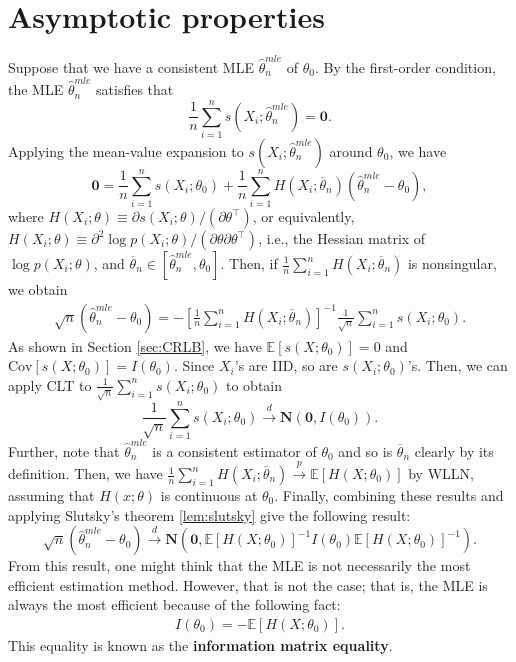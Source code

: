 \documentclass[10.5pt, A4paper, openany, uplatex]{book}
\newcommand{\mbf}{\mathbf}
\newcommand{\E}{\mathbb{E}}
\newcommand{\Cov}{\mathrm{Cov}}
\renewcommand{\hat}{\widehat}
\renewcommand{\bar}{\overline}
\numberwithin{equation}{section}
\begin{document}
\section{Asymptotic properties}
Suppose that we have a consistent MLE $\hat \theta_n^{mle}$ of $\theta_0$.
By the first-order condition, the MLE $\hat \theta_n^{mle}$ satisfies that
\[
	\frac{1}{n}\sum_{i = 1}^n s(X_i; \hat \theta_n^{mle}) = \mbf{0}.
\]
Applying the mean-value expansion to $s(X_i; \hat \theta_n^{mle}) $ around $\theta_0$, we have
\[
	\mbf{0} = \frac{1}{n}\sum_{i = 1}^n s(X_i; \theta_0) + \frac{1}{n}\sum_{i=1}^n H(X_i; \bar \theta_n) (\hat \theta_n^{mle} - \theta_0),
\]
where $H(X_i; \theta) \equiv \partial s(X_i; \theta)/(\partial \theta^\top)$, or equivalently, $H(X_i; \theta) \equiv \partial^2 \log p(X_i; \theta)/(\partial \theta \partial \theta^\top)$, i.e., the Hessian matrix of $\log p(X_i; \theta)$, and $\bar \theta_n \in [\hat \theta_n^{mle}, \theta_0]$.
Then, if $\frac{1}{n}\sum_{i=1}^n H(X_i; \bar \theta_n) $ is nonsingular, we obtain
\begin{align}\label{eq:taylor}
	\sqrt{n}(\hat \theta_n^{mle} - \theta_0) = -\left[\frac{1}{n}\sum_{i=1}^n H(X_i; \bar \theta_n) \right]^{-1}\frac{1}{\sqrt{n}}\sum_{i = 1}^n s(X_i; \theta_0).
\end{align}
As shown in Section \ref{sec:CRLB}, we have $\E[s(X; \theta_0)] = 0$ and $\Cov[s(X; \theta_0)] = I(\theta_0)$.
Since $X_i$'s are IID, so are $s(X_i; \theta_0)$'s.
Then, we can apply CLT to $\frac{1}{\sqrt{n}}\sum_{i = 1}^n s(X_i; \theta_0)$ to obtain
\[
	\frac{1}{\sqrt{n}}\sum_{i = 1}^n s(X_i; \theta_0) \overset{d}{\to} \mbf{N}(\mbf{0},  I(\theta_0)).
\]
Further, note that $\hat \theta_n^{mle}$ is a consistent estimator of $\theta_0$ and so is $\bar{\theta}_n$ clearly by its definition.
Then, we have $\frac{1}{n}\sum_{i=1}^n H(X_i; \bar \theta_n) \overset{p}{\to} \E[H(X; \theta_0)]$ by WLLN, assuming that $H(x; \theta)$ is continuous at $\theta_0$.
Finally, combining these results and applying Slutsky's theorem \ref{lem:slutsky} give the following result:
\[
	\sqrt{n}(\hat \theta_n^{mle} - \theta_0) \overset{d}{\to} \mbf{N}\left( \mbf{0}, \E[H(X; \theta_0)]^{-1} I(\theta_0) \E[H(X; \theta_0)]^{-1} \right).
\]
From this result, one might think that the MLE is not necessarily the most efficient estimation method.
However, that is not the case; that is, the MLE is always the most efficient because of the following fact:
\begin{align}\label{eq:infoeq}
	I(\theta_0) = - \E[H(X; \theta_0)].
\end{align}
This equality is known as the \textbf{information matrix equality}.
\bigskip
\end{document}
